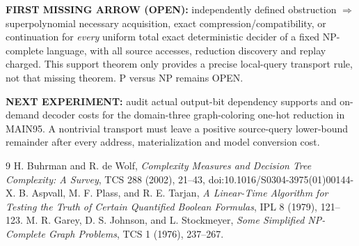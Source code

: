 \documentclass[11pt]{article}
\begin{document}
\noindent\textbf{FIRST MISSING ARROW (OPEN):} independently defined obstruction \(\Rightarrow\) superpolynomial necessary acquisition, exact compression/compatibility, or continuation for \emph{every} uniform total exact deterministic decider of a fixed NP-complete language, with all source accesses, reduction discovery and replay charged. This support theorem only provides a precise local-query transport rule, not that missing theorem. P versus NP remains OPEN.

\noindent\textbf{NEXT EXPERIMENT:} audit actual output-bit dependency supports and on-demand decoder costs for the domain-three graph-coloring one-hot reduction in MAIN95. A nontrivial transport must leave a positive source-query lower-bound remainder after every address, materialization and model conversion cost.

\begin{thebibliography}{9}
 H. Buhrman and R. de Wolf, \emph{Complexity Measures and Decision Tree Complexity: A Survey}, TCS 288 (2002), 21--43, doi:10.1016/S0304-3975(01)00144-X.
 B. Aspvall, M. F. Plass, and R. E. Tarjan, \emph{A Linear-Time Algorithm for Testing the Truth of Certain Quantified Boolean Formulas}, IPL 8 (1979), 121--123.
 M. R. Garey, D. S. Johnson, and L. Stockmeyer, \emph{Some Simplified NP-Complete Graph Problems}, TCS 1 (1976), 237--267.
\end{thebibliography}
\end{document}
